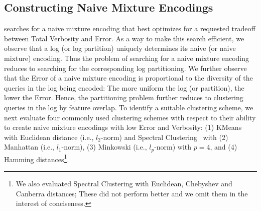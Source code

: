 \subsection{Constructing Naive Mixture Encodings}
\label{sec:constructingnaivemixtureencodings}
\systemnameone searches for a naive mixture encoding that best optimizes for a requested tradeoff between Total Verbosity and Error.  
As a way to make this search efficient, we observe that a log (or log partition) uniquely determines its naive (or naive mixture) encoding. 
Thus the problem of searching for a naive mixture encoding reduces to searching for the corresponding log partitioning.
We further observe that the Error of a naive mixture encoding is proportional to the diversity of the queries in the log being encoded: 
The more uniform the log (or partition), the lower the Error.
Hence, the partitioning problem further reduces to clustering queries in the log by feature overlap.
To identify a suitable clustering scheme, we next evaluate four commonly used clustering schemes with respect to their ability to create naive mixture encodings with low Error and Verbosity: (1) KMeans~\cite{DBLP:journals/prl/Jain10} with Euclidean distance (i.e., $l_2$-norm) and Spectral Clustering~\cite{DBLP:journals/jacm/KannanVV04} with (2) Manhattan (i.e., $l_1$-norm), (3) Minkowski (i.e., $l_p$-norm) with $p=4$, and (4) Hamming distances\footnote{We also evaluated Spectral Clustering with Euclidean, Chebyshev and Canberra distances; These did not perform better and we omit them in the interest of conciseness.}.
